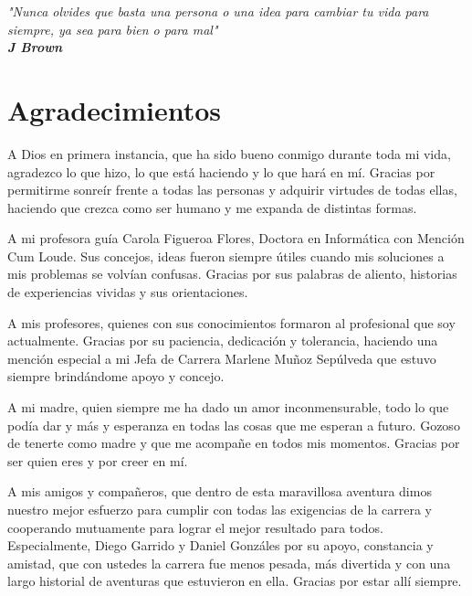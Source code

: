\newpage{\ }
\setcounter{page}{1}
\thispagestyle{empty}
\vfill
\begin{flushright}
	\emph{"Nunca olvides que basta una persona o una idea para cambiar tu vida para siempre, ya sea para bien o para mal"}\\
	\textbf{\textit{J Brown}}
\end{flushright}
\vfill

\chapter*{Agradecimientos}

A Dios en primera instancia, que ha sido bueno conmigo durante toda mi vida, agradezco lo que hizo, lo que está haciendo y lo que hará en mí. Gracias por permitirme sonreír frente a todas las personas y adquirir virtudes de todas ellas, haciendo que crezca como ser humano y me expanda de distintas formas.\\
\par A mi profesora guía Carola Figueroa Flores, Doctora en Informática con Mención Cum Loude. Sus concejos, ideas fueron siempre útiles cuando mis soluciones a mis problemas se volvían confusas. Gracias por sus palabras de aliento, historias de experiencias vividas y sus orientaciones.\\
\par A mis profesores, quienes con sus conocimientos formaron al profesional que soy actualmente. Gracias por su paciencia, dedicación y tolerancia, haciendo una mención especial a mi Jefa de Carrera Marlene Muñoz Sepúlveda que estuvo siempre brindándome apoyo y concejo.\\
\par A mi madre, quien siempre me ha dado un amor inconmensurable, todo lo que podía dar y más y esperanza en todas las cosas que me esperan a futuro. Gozoso de tenerte como madre y que me acompañe en todos mis momentos. Gracias por ser quien eres y por creer en mí.\\
\par A mis amigos y compañeros, que dentro de esta maravillosa aventura dimos nuestro mejor esfuerzo para cumplir con todas las exigencias de la carrera y cooperando mutuamente para lograr el mejor resultado para todos. Especialmente, Diego Garrido y Daniel Gonzáles por su apoyo, constancia y amistad, que con ustedes la carrera fue menos pesada, más divertida y con una largo historial de aventuras que estuvieron en ella. Gracias por estar allí siempre.


